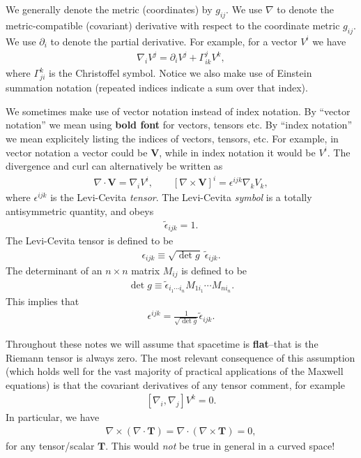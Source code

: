 \documentclass[12pt]{report}
\newcommand{\bT}{{\bm T}}
\newcommand{\bV}{{\bm V}}
\begin{document}
We generally denote the metric (coordinates) by $g_{ij}$.
We use $\nabla$ to denote the metric-compatible (covariant) derivative with respect to the coordinate metric $g_{ij}$.
We use $\partial_i$ to denote the partial derivative.
For example, for a vector $V^i$ we have
\begin{align}
    \nabla_iV^j
    =
    \partial_iV^j
    +
    \Gamma^j_{ik}V^k
    ,
\end{align}
where $\Gamma^k_{ji}$ is the Christoffel symbol.
Notice we also make use of Einstein summation notation (repeated indices indicate a sum over that index).

We sometimes make use of vector notation instead of index notation.
By ``vector notation'' we mean using \textbf{bold font} for vectors, tensors etc.
By ``index notation'' we mean explicitely listing the indices of vectors, tensors, etc.
For example, in vector notation a vector could be $\bV$, while in index notation it would be $V^i$.
The divergence and curl can alternatively be written as
\begin{align}
    \nabla\cdot\bV
    =
    \nabla_iV^i
    ,\qquad
    \left[\nabla\times \bV\right]^i
    =
    \epsilon^{ijk}\nabla_kV_k
    ,
\end{align}
where $\epsilon^{ijk}$ is the Levi-Cevita \emph{tensor}.
The Levi-Cevita \emph{symbol} is a totally antisymmetric quantity, and obeys
\begin{align}
    \tilde{\epsilon}_{ijk} = 1
    .
\end{align}
The Levi-Cevita tensor is defined to be
\begin{align}
    \epsilon_{ijk} \equiv \sqrt{\det g} \; \tilde{\epsilon}_{ijk}
    .
\end{align}
The determinant of an $n\times n$ matrix $M_{ij}$ is defined to be
\begin{align}
    \det g
    \equiv
    \tilde{\epsilon}_{i_1\cdots i_n}M_{1i_1}\cdots M_{ni_n}
    .
\end{align}
This implies that
\begin{align}
    \epsilon^{ijk}
    =
    \frac{1}{\sqrt{\det g}} \tilde{\epsilon}_{ijk}
    .
\end{align}

Throughout these notes we will assume that spacetime is \textbf{flat}--that is the Riemann tensor is always zero.
The most relevant consequence of this assumption (which holds well for the vast majority of practical applications of the Maxwell equations) is that the covariant derivatives of any tensor comment, for example
\begin{align}
    \left[\nabla_i,\nabla_j\right]V^k
    =
    0
    .
\end{align}
In particular, we have
\begin{align}
    \nabla\times\left(\nabla \cdot \bT\right) 
    =
    \nabla\cdot\left(\nabla \times \bT\right)
    =
    0
    ,
\end{align}
for any tensor/scalar $\bT$.
This would \emph{not} be true in general in a curved space! 
\end{document}
